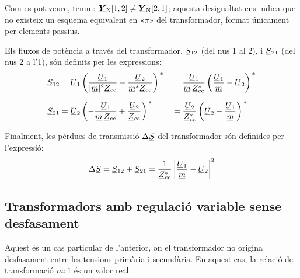 Com es pot veure, tenim: $\mcmplx{Y}\ped{N}[1,2] \neq
\mcmplx{Y}\ped{N}[2,1]$; aquesta desigualtat ens indica que no existeix un esquema
equivalent en «$\pi$» del transformador, format únicament per
elements passius.

Els fluxos de potència a través del transformador, $\cmplx{S}_{12}$
(del nus 1 al 2), i $\cmplx{S}_{21}$ (del nus 2 a l'1), són definits
per les expressions: 
\begin{alignat}{2}
   \cmplx{S}_{12} &= \cmplx{U}_1 \left( \frac{\cmplx{U}_1}{|\cmplx{m}|^2 \cmplx{Z}\ped{cc}} - \frac{\cmplx{U}_2}{\cmplx{m}^* \cmplx{Z}\ped{cc}} \right)^{\,*} &&= \frac{\cmplx{U}_1}{\cmplx{m}\, \cmplx{Z}\ped{cc}^*} \left( \frac{\cmplx{U}_1}{\cmplx{m}} - \cmplx{U}_2 \right)^{\,*} \label{eq:s12_trafo_reg_decal} \\[1.5ex]
   \cmplx{S}_{21} &= \cmplx{U}_2 \left( - \frac{\cmplx{U}_1}{\cmplx{m} \,\cmplx{Z}\ped{cc}} + \frac{\cmplx{U}_2} {\cmplx{Z}\ped{cc}} \right)^{\,*} &&= \frac{\cmplx{U}_2}{\cmplx{Z}\ped{cc}^*} \left(  \cmplx{U}_2 - \frac{\cmplx{U}_1}{\cmplx{m}}  \right)^{\,*} \label{eq:s21_trafo_reg_decal}
\end{alignat}

Finalment, les pèrdues de transmissió $\Delta\cmplx{S}$ del transformador són definides per l'expressió:
\begin{equation} \label{eq:ds_trafo_reg_decal}
   \Delta\cmplx{S} = \cmplx{S}_{12} + \cmplx{S}_{21} = \frac{1}{\cmplx{Z}\ped{cc}^*}  \left|
    \frac{\cmplx{U}_1}{\cmplx{m}} - \cmplx{U}_2 \right|^2
\end{equation}


\subsection{Transformadors amb regulació variable sense desfasament} \label{sec:trafo_reg}

Aquest és un cas particular de l'anterior, on el transformador no
origina desfasament entre les tensions primària i secundària.
En aquest cas, la relació de transformació $m\!:\!1$ és un valor real.


